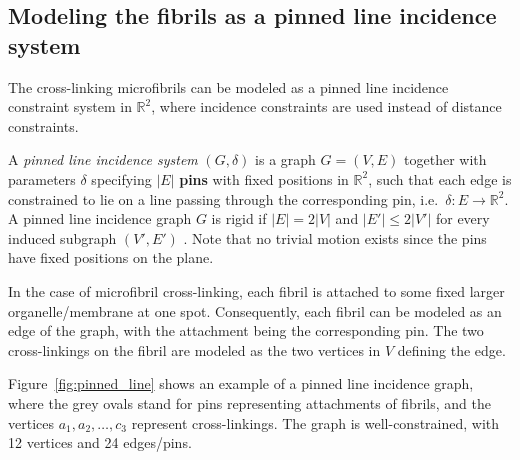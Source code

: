 \subsection{Modeling the fibrils as a pinned line incidence system}



The cross-linking  microfibrils can be modeled as a pinned line incidence constraint system in $\mathbb{R}^2$,
where incidence constraints are used instead of distance constraints.

A {\em pinned line incidence system} $(G,\delta)$  
is a graph $G=(V,E)$ together with parameters $\delta$ specifying $|E|$ \textbf{pins} with fixed positions in $\mathbb{R}^2$, 
such that each edge is constrained to lie on a line passing through 
the corresponding pin, i.e.\ $\delta: E \rightarrow \mathbb{R}^2$.
%
%
A pinned line incidence graph $G$ is rigid if $|E| = 2|V|$ and $|E'| \le 2|V'|$ for every induced subgraph $(V',E')$  \cite{xxx}. 
Note that no trivial motion exists since the pins have fixed positions on the plane.





In the case of microfibril cross-linking, each fibril is
attached to some fixed larger organelle/membrane at one spot.
Consequently, each fibril can be modeled as an edge of the graph,
with the attachment being the corresponding pin.
The two cross-linkings on the fibril are modeled as the two vertices in $V$ defining the edge.



Figure~\ref{fig:pinned_line} shows an example of a  pinned line incidence graph,
where the grey ovals stand for pins representing attachments of fibrils,
and the vertices $a_1,a_2,\ldots, c_3$ represent cross-linkings.
The graph is well-constrained, with 12 vertices and 24 edges/pins.

